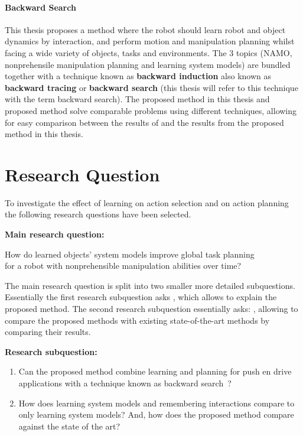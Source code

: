 \paragraph{Backward Search}
This thesis proposes a method where the robot should learn robot and object dynamics by interaction, and perform motion and manipulation planning whilst facing a wide variety of objects, tasks and environments. The 3 topics (\ac{NAMO}, nonprehensile manipulation planning and learning system models) are bundled together with a technique known as \textbf{backward induction} also known as \textbf{backward tracing} or \textbf{backward search} (this thesis will refer to this technique with the term backward search). The proposed method in this thesis and \citeauthor{sabbaghnovin_model_2021} proposed method solve comparable problems using different techniques, allowing for easy comparison between the results of \citeauthor{sabbaghnovin_model_2021} and the results from the proposed method in this thesis.\bs
{}

\section{Research Question}%
\label{sec:research_question}
To investigate the effect of learning on action selection and on action planning the following research questions have been selected.\bs

\textbf{Main research question:}
\begin{center}%
\label{researchquestion:main}
\large
How do learned objects' system models improve global task planning\\for a robot with nonprehensible manipulation abilities over time?
\end{center}

The main research question is split into two smaller more detailed subquestions. Essentially the first research subquestion asks , which allows to explain the proposed method. The second research subquestion essentially asks: , allowing to compare the proposed methods with existing state-of-the-art methods by comparing their results.\bs

\textbf{Research subquestion:}
\begin{enumerate}
    \item\label{researchsubquestion:does_it_work} Can the proposed method combine learning and planning for push en drive applications with a technique known as backward search~\cite{krontiris_dealing_2015}?
    \item\label{researchsubquestion:does_it_compare} How does learning system models and remembering interactions compare to only learning system models? And, how does the proposed method compare against the state of the art?
\end{enumerate}

